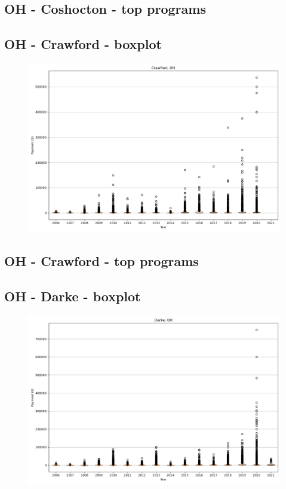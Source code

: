 \subsection*{OH - Coshocton - top programs}

\newpage
\subsection*{OH - Crawford - boxplot}
\begin{figure}[h]
\centering
\includegraphics[width=7in]{../output/boxplots/counties/Crawford-OH_boxplot.png}
\end{figure}


\subsection*{OH - Crawford - top programs}

\newpage
\subsection*{OH - Darke - boxplot}
\begin{figure}[h]
\centering
\includegraphics[width=7in]{../output/boxplots/counties/Darke-OH_boxplot.png}
\end{figure}



